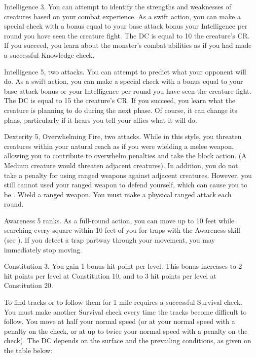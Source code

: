 \featpre Intelligence 3.
\featben You can attempt to identify the strengths and weaknesses of creatures based on your combat experience.
As a swift action, you can make a special check with a bonus equal to your base attack bonus \add your Intelligence  per round you have seen the creature fight.
The DC is equal to 10 \add the creature's CR.
If you succeed, you learn about the monster's combat abilities as if you had made a successful Knowledge check.

\featpres Intelligence 5, two attacks.
\featben You can attempt to predict what your opponent will do.
As a swift action, you can make a special check with a bonus equal to your base attack bonus or your Intelligence  per round you have seen the creature fight.
The DC is equal to 15 \add the creature's CR.
If you succeed, you learn what the creature is planning to do during the next phase.
Of course, it can change its plans, particularly if it hears you tell your allies what it will do.

\featpres Dexterity 5, Overwhelming Fire, two attacks.
\featben While in this style, you threaten creatures within your natural reach as if you were wielding a melee weapon, allowing you to contribute to overwhelm penalties and take the block action.
(A Medium creature would threaten adjacent creatures).
In addition, you do not take a  penalty for using ranged weapons against adjacent creatures.
However, you still cannot used your ranged weapon to defend yourself, which can cause you to be .
\stylereq Wield a ranged weapon.
You must make a physical ranged attack each round.

\featpre Awareness 5 ranks.
\featben As a full-round action, you can move up to 10 feet while searching every square within 10 feet of you for traps with the Awareness skill (see ).
If you detect a trap partway through your movement, you may immediately stop moving.

\featpre Constitution 3.
\featben You gain 1 bonus hit point per level.
This bonus increases to 2 hit points per level at Constitution 10, and to 3 hit points per level at Constitution 20.

\featben To find tracks or to follow them for 1 mile requires a successful Survival check.
You must make another Survival check every time the tracks become difficult to follow.
You move at half your normal speed (or at your normal speed with a  penalty on the check, or at up to twice your normal speed with a  penalty on the check).
The DC depends on the surface and the prevailing conditions, as given on the table below:

